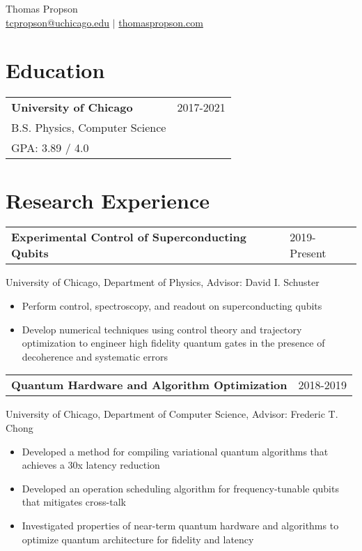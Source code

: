 \documentclass[letterpaper, 12pt]{article}
\begin{document}
\begin{center}
{\large Thomas Propson} \\[5pt]
\href{mailto:tcpropson@uchicago.edu}{tcpropson@uchicago.edu} $\vert$
\href{https://thomaspropson.com}{thomaspropson.com}
\end{center}


\flushleft

\section{Education}
\begin{tabular}{@{} L{12cm} @{} R{4.51cm} @{}}
  \textbf{University of Chicago} & 2017-2021\\
  B.S. Physics, Computer Science\\
  GPA: 3.89 / 4.0 &\\
\end{tabular}

\section{Research Experience}
\begin{tabular}{@{} L{12cm} @{} R{4.51cm} @{}}
  \textbf{Experimental Control of Superconducting Qubits} & 2019-Present\\
\end{tabular}
University of Chicago, Department of Physics, Advisor: David I. Schuster\\
\begin{itemize}
  \item Perform control, spectroscopy, and readout on superconducting qubits
  \item Develop numerical techniques using control theory and trajectory optimization
    to engineer high fidelity quantum gates in the presence of decoherence and systematic errors
\end{itemize}

\begin{tabular}{@{} L{12cm} @{} R{4.51cm} @{}}
  \textbf{Quantum Hardware and Algorithm Optimization} & 2018-2019\\
\end{tabular}
University of Chicago, Department of Computer Science, Advisor: Frederic T. Chong
\begin{itemize}
  \item Developed a method for compiling variational quantum algorithms that achieves a 30x latency reduction
  \item Developed an operation scheduling algorithm for frequency-tunable qubits that mitigates cross-talk
  \item Investigated properties of near-term quantum hardware and algorithms
    to optimize quantum architecture for fidelity and latency
\end{itemize}
\end{document}
